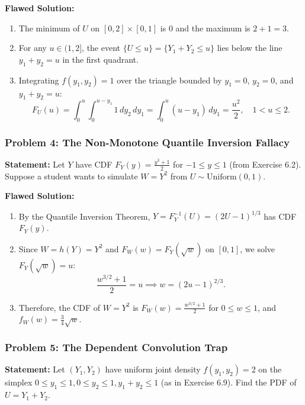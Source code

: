 \documentclass[11pt, letterpaper]{article}
\theoremstyle{definition}
\theoremstyle{remark}
\begin{document}
\textbf{Flawed Solution:}
\begin{enumerate}[label=Step \arabic*:]
    \item The minimum of $U$ on $[0, 2] \times [0, 1]$ is $0$ and the maximum is $2 + 1 = 3$.
    \item For any $u \in (1, 2]$, the event $\{U \le u\} = \{Y_1 + Y_2 \le u\}$ lies below the line $y_1 + y_2 = u$ in the first quadrant.
    \item Integrating $f(y_1, y_2) = 1$ over the triangle bounded by $y_1 = 0$, $y_2 = 0$, and $y_1 + y_2 = u$:
    \[
        F_U(u) = \int_{0}^{u} \int_{0}^{u - y_1} 1\,dy_2\,dy_1 = \int_{0}^{u} (u - y_1)\,dy_1 = \frac{u^2}{2}, \quad 1 < u \le 2.
    \]
\end{enumerate}

\hrulefill

\subsubsection*{Problem 4: The Non-Monotone Quantile Inversion Fallacy}
\textbf{Statement:} Let $Y$ have CDF $F_Y(y) = \frac{y^3 + 1}{2}$ for $-1 \le y \le 1$ (from Exercise 6.2). Suppose a student wants to simulate $W = Y^2$ from $U \sim \text{Uniform}(0, 1)$.

\textbf{Flawed Solution:}
\begin{enumerate}[label=Step \arabic*:]
    \item By the Quantile Inversion Theorem, $Y = F_Y^{-1}(U) = (2U - 1)^{1/3}$ has CDF $F_Y(y)$.
    \item Since $W = h(Y) = Y^2$ and $F_W(w) = F_Y(\sqrt{w})$ on $[0, 1]$, we solve $F_Y(\sqrt{w}) = u$:
    \[
        \frac{w^{3/2} + 1}{2} = u \implies w = (2u - 1)^{2/3}.
    \]
    \item Therefore, the CDF of $W = Y^2$ is $F_W(w) = \frac{w^{3/2} + 1}{2}$ for $0 \le w \le 1$, and $f_W(w) = \frac{3}{4}\sqrt{w}$.
\end{enumerate}

\hrulefill

\subsubsection*{Problem 5: The Dependent Convolution Trap}
\textbf{Statement:} Let $(Y_1, Y_2)$ have uniform joint density $f(y_1, y_2) = 2$ on the simplex $0 \le y_1 \le 1, 0 \le y_2 \le 1, y_1 + y_2 \le 1$ (as in Exercise 6.9). Find the PDF of $U = Y_1 + Y_2$.
\end{document}
